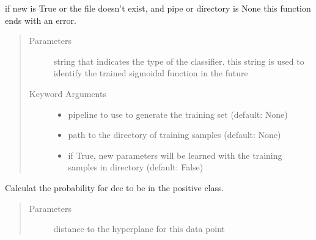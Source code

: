 \documentclass[letterpaper,10pt,english]{sphinxmanual}
\begin{document}
\begin{fulllineitems}
\begin{fulllineitems}
if new is True or the file doesn’t exist, and pipe or
directory is None this function ends with an error.
\begin{quote}\begin{description}
\item[{Parameters}] \leavevmode
{} \textendash{} string that indicates the type of the
classifier. this string is used to identify the trained
sigmoidal function in the future

\item[{Keyword Arguments}] \leavevmode\begin{itemize}
\item {} 
 \textendash{} pipeline to use to generate the training set (default:
None)

\item {} 
 \textendash{} path to the directory of training samples
(default: None)

\item {} 
 \textendash{} if True, new parameters will be learned with the
training samples in directory (default: False)

\end{itemize}

\end{description}\end{quote}

\end{fulllineitems}


\begin{fulllineitems}
\label{\detokenize{api:probability.Probability.calculate_probability}}
Calculat the probability for dec to be in the positive class.
\begin{quote}\begin{description}
\item[{Parameters}] \leavevmode
{} \textendash{} distance to the hyperplane for this data point

\end{description}\end{quote}

\end{fulllineitems}



\end{fulllineitems}
\end{document}
